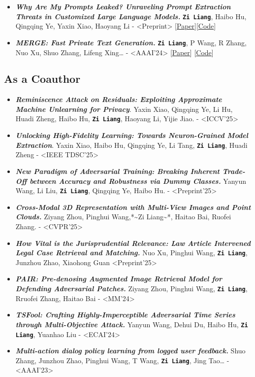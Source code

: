 \documentclass[11pt]{article}
\begin{document}
\begin{itemize}
\item \emph{\textbf{Why Are My Prompts Leaked? Unraveling Prompt Extraction Threats in Customized Large Language Models.}} \textbf{\texttt{Zi Liang}}, Haibo Hu, Qingqing Ye, Yaxin Xiao, Haoyang Li - <Preprint> [\href{https://arxiv.org/abs/2408.02416}{Paper}][\href{https://github.com/liangzid/PromptExtractionEval}{Code}]
\item \emph{\textbf{MERGE: Fast Private Text Generation.}}  \textbf{\texttt{Zi Liang}}, P Wang, R Zhang, Nuo Xu, Shuo Zhang, Lifeng Xing… - <AAAI'24> [\href{https://arxiv.org/abs/2305.15769}{Paper}] [\href{https://github.com/liangzid/MERGE}{Code}]
\end{itemize}
\subsection{As a Coauthor}
\label{sec:org8990de0}
\begin{itemize}
\item \emph{\textbf{Reminiscence Attack on Residuals: Exploiting Approximate Machine Unlearning for Privacy}}. Yaxin Xiao, Qingqing Ye, Li Hu, Huadi Zheng, Haibo Hu, \textbf{\texttt{Zi Liang}}, Haoyang Li, Yijie Jiao. - <ICCV'25>
\item \emph{\textbf{Unlocking High-Fidelity Learning: Towards Neuron-Grained Model Extraction}}. Yaxin Xiao, Haibo Hu, Qingqing Ye, Li Tang, \textbf{\texttt{Zi Liang}}, Huadi Zheng - <IEEE TDSC'25>
\item \emph{\textbf{New Paradigm of Adversarial Training: Breaking Inherent Trade-Off between Accuracy and Robustness via Dummy Classes.}} Yanyun Wang, Li Liu, \textbf{\texttt{Zi Liang}}, Qingqing Ye, Haibo Hu. - <Preprint'25>
\item \emph{\textbf{Cross-Modal 3D Representation with Multi-View Images and Point Clouds.}} Ziyang Zhou, Pinghui Wang,*\textasciitilde{}Zi Liang\textasciitilde{}*, Haitao Bai, Ruofei Zhang. - <CVPR'25>
\item \emph{\textbf{How Vital is the Jurisprudential Relevance: Law Article Intervened Legal Case Retrieval and Matching.}} Nuo Xu, Pinghui Wang, \textbf{\texttt{Zi Liang}}, Junzhou Zhao, Xiaohong Guan <Preprint'25>
\item \emph{\textbf{PAIR: Pre-denosing Augmented Image Retrieval Model for Defending Adversarial Patches.}} Ziyang Zhou, Pinghui Wang, \textbf{\texttt{Zi Liang}}, Rruofei Zhang, Haitao Bai - <MM'24>
\item \emph{\textbf{TSFool: Crafting Highly-Imperceptible Adversarial Time Series through Multi-Objective Attack.}} Yanyun Wang, Dehui Du, Haibo Hu,  \textbf{\texttt{Zi Liang}}, Yuanhao Liu - <ECAI'24>
\item \emph{\textbf{Multi-action dialog policy learning from logged user feedback.}} Shuo Zhang, Junzhou Zhao, Pinghui Wang, T Wang,  \textbf{\texttt{Zi Liang}}, Jing Tao… - <AAAI'23>
\end{itemize}
\end{document}
